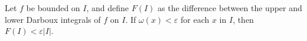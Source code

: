 Let $f$ be bounded on $I$, and define $F(I)$ as the difference between the upper and lower Darboux integrals of $f$ on $I$. If $\omega(x) < \varepsilon$ for each $x$ in $I$, then $F(I) < \varepsilon|I|$.
